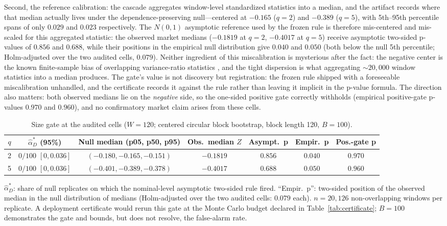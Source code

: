 \documentclass[3p]{elsarticle}
\begin{document}
Second, the reference calibration: the cascade aggregates window-level
standardized statistics into a median, and the artifact records where that
median actually lives under the dependence-preserving null---centered at
$-0.165$ ($q{=}2$) and $-0.389$ ($q{=}5$), with 5th--95th percentile spans of
only $0.029$ and $0.023$ respectively. The $N(0,1)$ asymptotic reference used
by the frozen rule is therefore mis-centered and mis-scaled for this
aggregated statistic: the observed market medians ($-0.1819$ at $q{=}2$,
$-0.4017$ at $q{=}5$) receive asymptotic two-sided p-values of $0.856$ and
$0.688$, while their positions in the empirical null distribution give
$0.040$ and $0.050$ (both below the null 5th percentile; Holm-adjusted over
the two audited cells, $0.079$). Neither ingredient of this miscalibration is
mysterious after the fact: the negative center is the known finite-sample
bias of overlapping variance-ratio statistics \citep{LoMacKinlay1989}, and
the tight dispersion is what aggregating $\sim$$20{,}000$ window statistics
into a median produces. The gate's value is not discovery but registration:
the frozen rule shipped with a foreseeable miscalibration unhandled, and the
certificate records it against the rule rather than leaving it implicit in
the p-value formula. The direction also matters: both observed medians lie on
the \emph{negative} side, so the one-sided positive gate correctly withholds
(empirical positive-gate p-values $0.970$ and $0.960$), and no confirmatory
market claim arises from these cells.

\begin{table}[htbp]
\centering
\begin{threeparttable}
\caption{Size gate at the audited cells ($W{=}120$; centered circular block
bootstrap, block length 120, $B=100$).}
\label{tab:size}
\small
\begin{tabular}{c c c c c c c}
\toprule
$q$ & $\widehat{\alpha}_D^\ast$ (95\%) & Null median (p05, p50, p95) & Obs.\ median $Z$ & Asympt.\ p & Empir.\ p & Pos.-gate p \\
\midrule
2 & $0/100$ $[0,0.036]$ & $(-0.180, -0.165, -0.151)$ & $-0.1819$ & $0.856$ & $0.040$ & $0.970$ \\
5 & $0/100$ $[0,0.036]$ & $(-0.401, -0.389, -0.378)$ & $-0.4017$ & $0.688$ & $0.050$ & $0.960$ \\
\bottomrule
\end{tabular}
\begin{tablenotes}\footnotesize
\item $\widehat{\alpha}_D^\ast$: share of null replicates on which the
nominal-level asymptotic two-sided rule fired. ``Empir.\ p'': two-sided
position of the observed median in the null distribution of medians
(Holm-adjusted over the two audited cells: $0.079$ each). $n=20{,}126$
non-overlapping windows per replicate. A deployment certificate would rerun
this gate at the Monte Carlo budget declared in Table~\ref{tab:certificate};
$B=100$ demonstrates the gate and bounds, but does not resolve, the
false-alarm rate.
\end{tablenotes}
\end{threeparttable}
\end{table}
\end{document}
